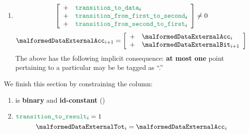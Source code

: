 \begin{enumerate}[resume]
    \item \If
        \[
            \left[ \begin{array}{cl}
                + & \locTransitionToData            _{i} \\
                + & \locTransitionFromFirstToSecond _{i} \\
                + & \locTransitionFromSecondToFirst _{i} \\
            \end{array} \right]
            \neq 0
        \]
        \Then
        \[
            \malformedDataExternalAcc _{i + 1} =
            \left[ \begin{array}{cl}
                + & \malformedDataExternalAcc _{i}     \\
                + & \malformedDataExternalBit _{i + 1} \\
            \end{array} \right]
        \]
        \saNote{} The above has the following implicit consequence: \textbf{at most one} point pertaining to a particular \blsId{} may be be tagged as ``\malformedDataExternalBit.''
\end{enumerate}
We finish this section by constraining the \malformedDataExternalTot{} column:
\begin{enumerate}[resume]
    \item \malformedDataExternalTot{} is \textbf{binary} and \textbf{id-constant} \quad (\trash)
    \item \If $\locTransitionToResult_{i} = 1$ \Then
        \[
            \malformedDataExternalTot_{i} = \malformedDataExternalAcc _{i}
        \]
\end{enumerate}
